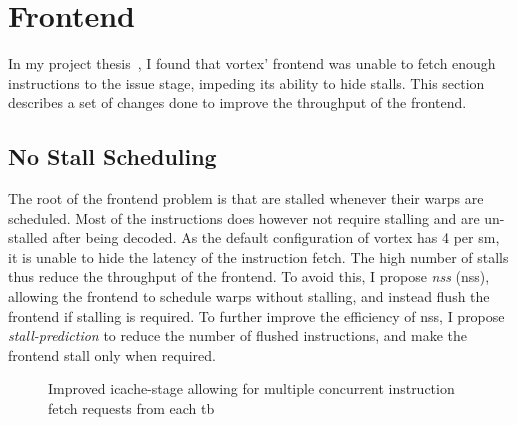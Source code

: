 \section{Frontend}

In my project thesis~\cite{Aurud_Project}, I found that \Gls{vortex}' frontend was unable to fetch enough instructions to the issue stage, impeding its ability to hide stalls. This section describes a set of changes done to improve the throughput of the frontend.

\subsection{No Stall Scheduling} \label{sec:no_stall_scheduling}

The root of the frontend problem is that  are stalled whenever their warps are scheduled. Most of the instructions does however not require stalling and are un-stalled after being decoded. As the default configuration of \Gls{vortex} has 4  per \acrshort{sm}, it is unable to hide the latency of the instruction fetch. The high number of stalls thus reduce the throughput of the frontend. To avoid this, I propose \textit{\acrlong{nss}} (\acrshort{nss}), allowing the frontend to schedule warps without stalling, and instead flush the frontend if stalling is required. To further improve the efficiency of \acrshort{nss}, I propose \textit{stall-prediction} to reduce the number of flushed instructions, and make the frontend stall only when required.

\begin{figure}
    \centering
    \caption[Illustration of the improved icache-stage.]{Improved icache-stage allowing for multiple concurrent instruction fetch requests from each \acrshort{tb}}
    \label{fig:new_icache_stage}
\end{figure}

